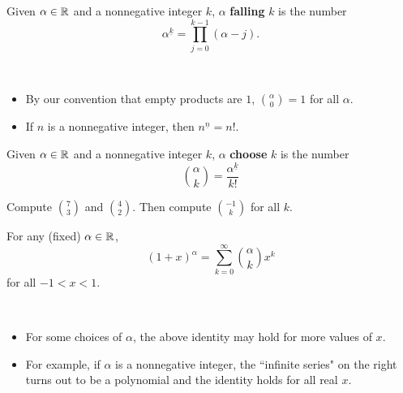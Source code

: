 

\begin{definition}
Given $\alpha\in\mathbb R$ and a nonnegative integer $k$, $\alpha$ \textbf{falling} $k$ is the number
\begin{equation*}
\alpha^{\underline{k}} = \prod_{j=0}^{k-1}(\alpha-j).
\end{equation*}
\end{definition}
\begin{remark}\,
\begin{itemize}
\item By our convention that empty products are $1$, $\binom{\alpha}{0}=1$ for all $\alpha$.
\item If $n$ is a nonnegative integer, then $n^{\underline{n}}=n!$.
\end{itemize}
\end{remark}


\begin{definition}
Given $\alpha\in\mathbb R$ and a nonnegative integer $k$, $\alpha$ \textbf{choose} $k$ is the number
\begin{equation*}
\binom{\alpha}{k} = \frac{\alpha^{\underline{k}}}{k!}
\end{equation*}
\end{definition}

\begin{example}
Compute $\binom{7}{3}$ and $\binom{4}{2}$.
Then compute $\binom{-1}{k}$ for all $k$.
\end{example}

\newpage

\begin{theorem}
For any (fixed) $\alpha\in\mathbb R$,
\begin{equation*}
(1+x)^\alpha = \sum_{k=0}^\infty\binom{\alpha}{k}x^k
\end{equation*}
for all $-1< x< 1$.
\end{theorem}
\begin{remark}\,
\begin{itemize}
\item For some choices of $\alpha$, the above identity may hold for more values of $x$.
\item For example, if $\alpha$ is a nonnegative integer, the ``infinite series" on the right turns out to be a polynomial and the identity holds for all real $x$.
\end{itemize}
\end{remark}


